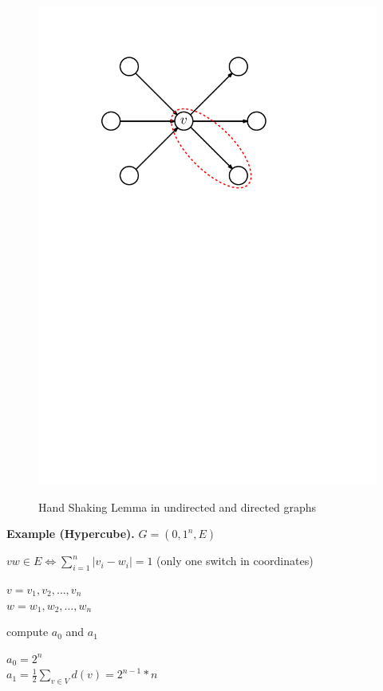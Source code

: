 \begin{figure}[htb]
{	\includegraphics[scale=.5]{01_graph_theory/pics/directed-graph_degree_handshaking-lemma.pdf}
}
\caption{Hand Shaking Lemma in undirected and directed graphs}
\label{fig:hand_shaking_lemma}
\end{figure}
\FloatBarrier

\textbf{Example (Hypercube).} 
$G = ({0,1}^n, E)$

$vw \in E \Leftrightarrow \sum_{i=1}^{n} |v_i - w_i | = 1$ (only one switch in coordinates)

$v = v_1, v_2, \ldots , v_n$\\
$w = w_1, w_2, \ldots , w_n$

compute $a_0$ and $a_1$

$a_0 = 2^n$ \\
$a_1 = \frac{1}{2} \sum_{v \in V} d(v) = 2^{n-1} * n$

